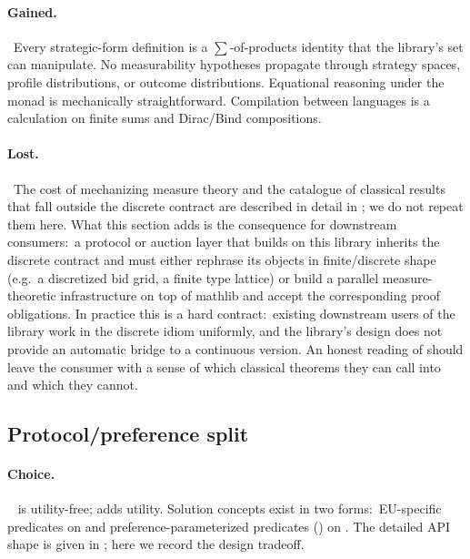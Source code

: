 \paragraph{Gained.}\ Every strategic-form definition is a
$\sum$-of-products identity that the library's  set can
manipulate.  No measurability hypotheses propagate through
strategy spaces, profile distributions, or outcome distributions.
Equational reasoning under the  monad is mechanically
straightforward.  Compilation between languages is a calculation
on finite sums and Dirac/Bind compositions.

\paragraph{Lost.}\ The cost of mechanizing measure theory and
the catalogue of classical results that fall outside the discrete
contract are described in detail in
; we do not repeat them here.  What this section adds
is the consequence for downstream consumers:\ a protocol or
auction layer that builds on this library inherits the discrete
contract and must either rephrase its objects in finite/discrete
shape (e.g.\ a discretized bid grid, a finite type lattice) or
build a parallel measure-theoretic infrastructure on top of
mathlib and accept the corresponding proof obligations.  In
practice this is a hard contract:\ existing downstream users of
the library work in the discrete idiom uniformly, and the
library's design does not provide an automatic bridge to a
continuous version.  An honest reading of 
should leave the consumer with a sense of which classical
theorems they can call into and which they cannot.

\subsection{Protocol/preference split}
\label{sec:discussion:protocol-preference}

\paragraph{Choice.}\  is utility-free; 
adds utility.  Solution concepts exist in two forms:\ EU-specific
predicates on  and preference-parameterized
predicates () on .  The detailed API shape is
given in ; here we record the
design tradeoff.

